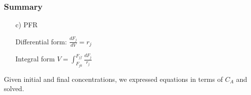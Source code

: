 \begin{frame}\frametitle{Summary}
	\begin{itemize}
		\item[c)]{PFR}

		Differential form: $\displaystyle\frac{dF_j}{dV} = r_j$

		Integral form $V = \displaystyle\int_{F_{j0}}^{F_{jf}}\frac{dF_j}{r_j}$
	\end{itemize}
	
	Given initial and final concentrations, we expressed equations in terms of $C_A$ and solved.
\end{frame}

